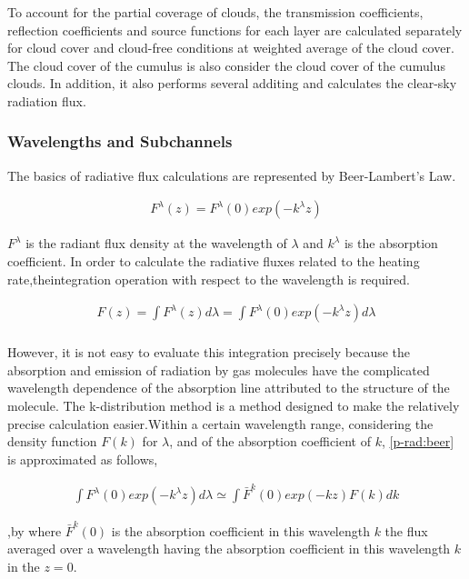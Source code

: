 To account for the partial coverage of clouds, the transmission coefficients, reflection coefficients and source functions for each layer are calculated separately for cloud cover and cloud-free conditions at weighted average of the cloud cover. The cloud cover of the cumulus is also consider the cloud cover of the cumulus clouds. In addition, it also performs several additing and calculates the
clear-sky radiation flux.

\hypertarget{wavelengths-and-subchannels}{%
\subsubsection{Wavelengths and
Subchannels}\label{wavelengths-and-subchannels}}

The basics of radiative flux calculations are represented by Beer-Lambert's Law.

\begin{eqnarray}
  F^\lambda(z) = F^\lambda(0) exp (-k^\lambda z)
\end{eqnarray}

\(F^\lambda\) is the radiant flux density at the wavelength of \(\lambda\) and \(k^\lambda\) is the absorption coefficient. In order to calculate the radiative fluxes related to the heating rate,theintegration operation with respect to the wavelength is required.

\begin{eqnarray}
  F(z) = \int F^\lambda(z) d \lambda 
 = \int F^\lambda(0) exp (-k^\lambda z) d \lambda \label{p-rad:beer}\\
\end{eqnarray}

However, it is not easy to evaluate this integration precisely because the absorption and emission of radiation by gas molecules have the complicated wavelength dependence of the absorption line attributed to the structure of the molecule. The k-distribution method is a method designed to make the relatively precise calculation easier.Within a certain wavelength range, considering the density function \(F(k)\) for \(\lambda\), and of the absorption coefficient of \(k\), \eqref{p-rad:beer} is approximated as follows, 

\begin{eqnarray}
 \int F^\lambda(0) exp (-k^\lambda z) d \lambda 
 \simeq \int \bar{F}^k(0) exp (-k z) F(k) dk
\end{eqnarray}

 ,by where \(\bar{F}^k(0)\) is  the
absorption coefficient in this wavelength \(k\) the flux averaged over a wavelength having the absorption coefficient in this wavelength \(k\)in the \(z=0\). 

